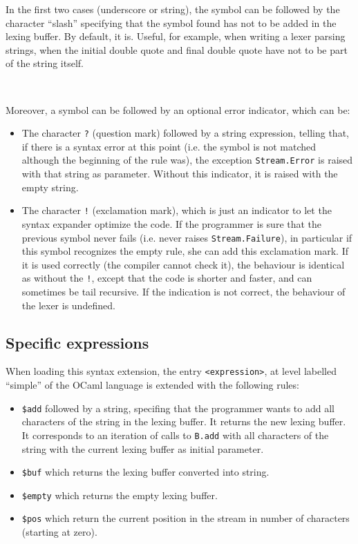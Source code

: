 \documentclass[11pt]{article}
\begin{document}
In the first two cases (underscore or string), the symbol can be
followed by the character ``slash'' specifying that the symbol found
has not to be added in the lexing buffer. By default, it is. Useful,
for example, when writing a lexer parsing strings, when the initial
double quote and final double quote have not to be part of the string
itself.

\

Moreover, a symbol can be followed by an optional error indicator,
which can be:

\begin{itemize}

\item The character \verb/?/ (question mark) followed by a string
  expression, telling that, if there is a syntax error at this point
  (i.e. the symbol is not matched although the beginning of the rule
  was), the exception \verb/Stream.Error/ is raised with that string
  as parameter. Without this indicator, it is raised with the empty
  string.

\item The character \verb/!/ (exclamation mark), which is just an
  indicator to let the syntax expander optimize the code. If the
  programmer is sure that the previous symbol never fails (i.e. never
  raises \verb/Stream.Failure/), in particular if this symbol
  recognizes the empty rule, she can add this exclamation mark. If it
  is used correctly (the compiler cannot check it), the behaviour is
  identical as without the \verb/!/, except that the code is shorter
  and faster, and can sometimes be tail recursive. If the indication
  is not correct, the behaviour of the lexer is undefined.

\end{itemize}

\subsection{Specific expressions}
\label{specific}

When loading this syntax extension, the entry \verb/<expression>/, at
level labelled ``simple'' of the OCaml language is extended with the
following rules:

\begin{itemize}

\item \verb/$add/ followed by a string, specifing that the programmer
  wants to add all characters of the string in the lexing buffer. It
  returns the new lexing buffer. It corresponds to an iteration of
  calls to \verb/B.add/ with all characters of the string with the
  current lexing buffer as initial parameter.

\item \verb/$buf/ which returns the lexing buffer converted into
  string.

\item \verb/$empty/ which returns the empty lexing buffer.

\item \verb/$pos/ which return the current position in the stream in
  number of characters (starting at zero).

\end{itemize}
\end{document}
